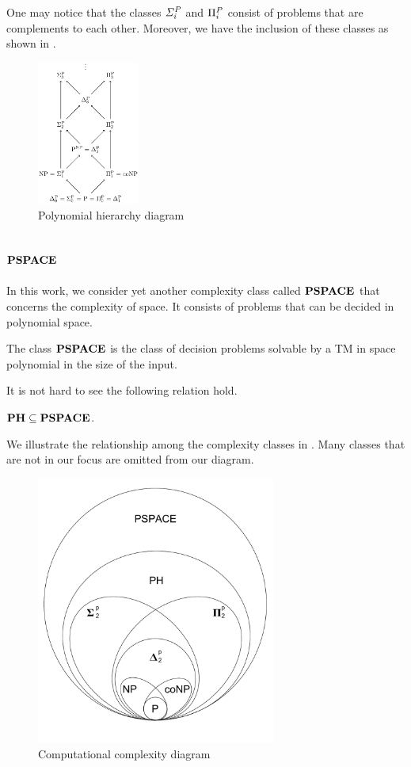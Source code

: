 One may notice that the classes $\mathit{\Sigma^P_{i}}$ and $\Pi^P_{i}$ consist
of problems that are complements to each other.
Moreover, we have the inclusion of these classes as shown in .

\begin{figure}[h!]
  \centering
  \includegraphics[width=0.3\textwidth]{img/ph_diagram.png}
  \caption{Polynomial hierarchy diagram \label{fig:ph_diagram}}
\end{figure}

\subsection{$\textbf{PSPACE}$}
In this work, we consider yet another complexity class called $\textbf{PSPACE}$ that
concerns the complexity of space.
It consists of problems that can be decided in polynomial space.

\begin{definition}
	The class $\textbf{PSPACE}$ is the class of decision problems solvable by a TM
	in space polynomial in the size of the input.
\end{definition}
It is not hard to see the following relation hold.
\begin{center}
	$\textbf{PH} \subseteq \textbf{PSPACE}$.
\end{center}

We illustrate the relationship among the complexity classes in
. Many classes that are not in our focus 
are omitted from our diagram.

\begin{figure}[h!]
  \centering
  \includegraphics[width=0.7\textwidth]{img/comp_diagram.pdf}
  \caption{Computational complexity diagram \label{fig:comp_diagram}}
\end{figure}


